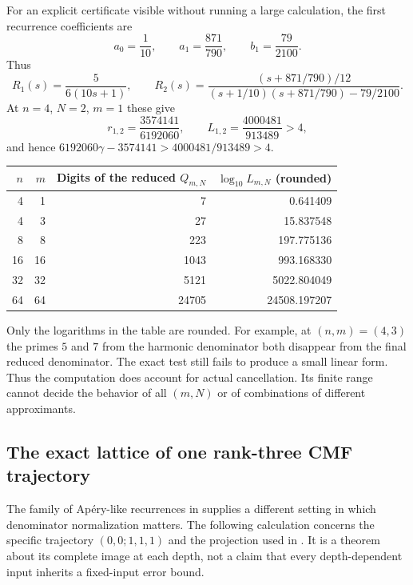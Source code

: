 \documentclass[11pt,a4paper]{article}
\numberwithin{equation}{section}
\theoremstyle{definition}
\theoremstyle{remark}
\begin{document}
For an explicit certificate visible without running a large
calculation, the first recurrence coefficients are
\[
 a_0=\frac1{10},\qquad
 a_1=\frac{871}{790},\qquad b_1=\frac{79}{2100}.
\]
Thus
\[
 R_1(s)=\frac5{6(10s+1)},\qquad
 R_2(s)=
 \frac{(s+871/790)/12}
 {(s+1/10)(s+871/790)-79/2100}.
\]
At $n=4$, $N=2$, $m=1$ these give
\begin{equation}\label{ga:small-certificate}
 r_{1,2}=\frac{3574141}{6192060},\qquad
 L_{1,2}=\frac{4000481}{913489}>4,
\end{equation}
and hence
$6192060\gamma-3574141>4000481/913489>4$.

\begin{center}
\begin{tabular}{@{}rrrr@{}}
\hline
$n$ & $m$ & Digits of the reduced $Q_{m,N}$
 & $\log_{10}L_{m,N}$ (rounded)\\
\hline
4  & 1  & 7     & 0.641409\\
4  & 3  & 27    & 15.837548\\
8  & 8  & 223   & 197.775136\\
16 & 16 & 1043  & 993.168330\\
32 & 32 & 5121  & 5022.804049\\
64 & 64 & 24705 & 24508.197207\\
\hline
\end{tabular}
\end{center}

Only the logarithms in the table are rounded.  For example, at
$(n,m)=(4,3)$ the primes $5$ and $7$ from the harmonic
denominator both disappear from the final reduced denominator.
The exact test still fails to produce a small linear form.
Thus the computation does account for actual cancellation.
Its finite range cannot decide the behavior of all $(m,N)$
or of combinations of different approximants.

\subsection{The exact lattice of one rank-three CMF trajectory}
\label{ga:cmf}

The family of Ap\'ery-like recurrences in \cite{CMF2026} supplies a
different setting in which denominator normalization matters.
The following calculation concerns the specific trajectory
$(0,0;1,1,1)$ and the projection used in \cite{VMRC033}.
It is a theorem about its complete image at each depth, not a claim
that every depth-dependent input inherits a fixed-input error bound.
\end{document}
